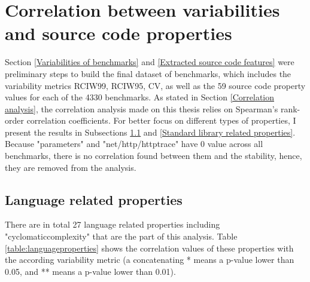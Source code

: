 \documentclass{seal_thesis}
\begin{document}
\section{Correlation between variabilities and source code properties}
\label{Correlation results}

Section \ref{Variabilities of benchmarks} and \ref{Extracted source code features} were preliminary steps to build the final dataset of benchmarks, which includes the variability metrics RCIW99, RCIW95, CV, as well as the 59 source code property values for each of the 4330 benchmarks. As stated in Section \ref{Correlation analysis}, the correlation analysis made on this thesis relies on Spearman's rank-order correlation coefficients. For better focus on different types of properties, I present the results in Subsections \ref{Language related properties} and \ref{Standard library related properties}. Because "parameters" and "net/http/httptrace" have 0 value across all benchmarks, there is no correlation found between them and the stability, hence, they are removed from the analysis.

\subsection{Language related properties}
\label{Language related properties}

There are in total 27 language related properties including "cyclomaticcomplexity" that are the part of this analysis. Table \ref{table:languageproperties} shows the correlation values of these properties with the according variability metric (a concatenating * means a p-value lower than 0.05, and ** means a p-value lower than 0.01).
\end{document}
